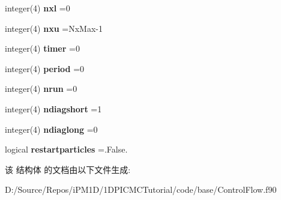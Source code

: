 \begin{DoxyCompactItemize}
integer(4) {\bfseries nxl} =0
\item 
\mbox{\label{structmodulecontrolflow_1_1controlflow_ab7548234fcde8039c0c38cb5f8c4af4e}} 
integer(4) {\bfseries nxu} =Nx\+Max-\/1
\item 
\mbox{\label{structmodulecontrolflow_1_1controlflow_a69d4b81c37354fedbe8ca535f7481dec}} 
integer(4) {\bfseries timer} =0
\item 
\mbox{\label{structmodulecontrolflow_1_1controlflow_ac9b0c9da62cc46a28a7ce6b0891b12e7}} 
integer(4) {\bfseries period} =0
\item 
\mbox{\label{structmodulecontrolflow_1_1controlflow_a715fc37c9426961eb4c1e1568c6b38f2}} 
integer(4) {\bfseries nrun} =0
\item 
\mbox{\label{structmodulecontrolflow_1_1controlflow_ac3216ac8b6cce27d8cd5894e1cfe85a2}} 
integer(4) {\bfseries ndiagshort} =1
\item 
\mbox{\label{structmodulecontrolflow_1_1controlflow_a51da9134ba9dc4172f96be34b74ea98e}} 
integer(4) {\bfseries ndiaglong} =0
\item 
\mbox{\label{structmodulecontrolflow_1_1controlflow_a30e16cdfb2a6d6ae78de28512125ca91}} 
logical {\bfseries restartparticles} =.False.
\end{DoxyCompactItemize}


该 结构体 的文档由以下文件生成\+:\begin{DoxyCompactItemize}
\item 
D\+:/\+Source/\+Repos/i\+P\+M1\+D/1\+D\+P\+I\+C\+M\+C\+Tutorial/code/base/Control\+Flow.\+f90\end{DoxyCompactItemize}
